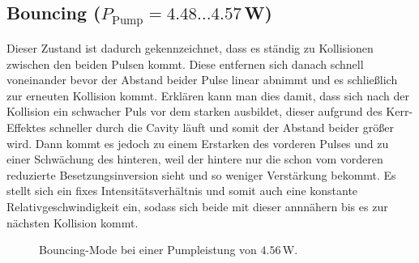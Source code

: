 \documentclass[bachelor,       %
               twoside,        %
               BCOR10mm,       %
               english,ngerman, %
               ]{GAUBM}
\begin{document}
\subsection{Bouncing ($P_\text{Pump}=4.48\dots4.57\,$W)}
Dieser Zustand ist dadurch gekennzeichnet, dass es ständig zu Kollisionen zwischen den beiden Pulsen kommt.
Diese entfernen sich danach schnell voneinander bevor der Abstand beider Pulse linear abnimmt und es schließlich zur erneuten Kollision kommt.
Erklären kann man dies damit, dass sich nach der Kollision ein schwacher Puls vor dem starken ausbildet, dieser aufgrund des Kerr-Effektes schneller durch die Cavity läuft und somit der Abstand beider größer wird.
Dann kommt es jedoch zu einem Erstarken des vorderen Pulses und zu einer Schwächung des hinteren, weil der hintere nur die schon vom vorderen reduzierte Besetzungsinversion sieht und so weniger Verstärkung bekommt.
Es stellt sich ein fixes Intensitätsverhältnis und somit auch eine konstante Relativgeschwindigkeit ein, sodass sich beide mit dieser annnähern bis es zur nächsten Kollision kommt.

\begin{figure}[!htb]
   \centering   
   \hfill
   \caption{Bouncing-Mode bei einer Pumpleistung von $4.56\,$W.}
   \label{fig:bouncing456}
 \end{figure}
\end{document}

